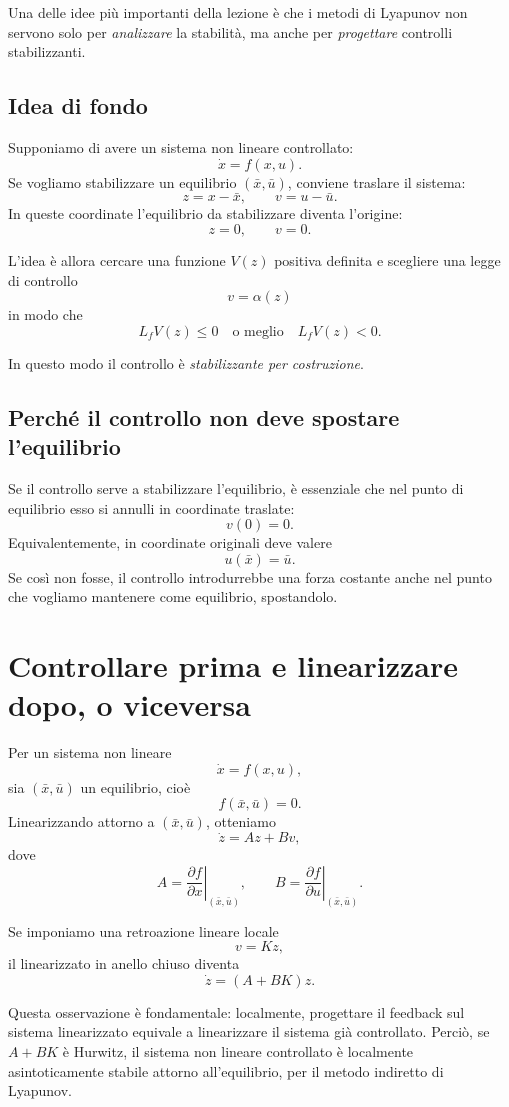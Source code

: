 Una delle idee più importanti della lezione è che i metodi di Lyapunov non servono solo per \emph{analizzare} la stabilità, ma anche per \emph{progettare} controlli stabilizzanti.

\subsection{Idea di fondo}

Supponiamo di avere un sistema non lineare controllato:
\[
\dot x = f(x,u).
\]
Se vogliamo stabilizzare un equilibrio \((\bar x,\bar u)\), conviene traslare il sistema:
\[
z=x-\bar x,
\qquad
v=u-\bar u.
\]
In queste coordinate l'equilibrio da stabilizzare diventa l'origine:
\[
z=0,\qquad v=0.
\]

L'idea è allora cercare una funzione \(V(z)\) positiva definita e scegliere una legge di controllo
\[
v=\alpha(z)
\]
in modo che
\[
L_fV(z)\le 0
\quad \text{o meglio} \quad
L_fV(z)<0.
\]

In questo modo il controllo è \emph{stabilizzante per costruzione}.

\subsection{Perché il controllo non deve spostare l'equilibrio}

Se il controllo serve a stabilizzare l'equilibrio, è essenziale che nel punto di equilibrio esso si annulli in coordinate traslate:
\[
v(0)=0.
\]
Equivalentemente, in coordinate originali deve valere
\[
u(\bar x)=\bar u.
\]
Se così non fosse, il controllo introdurrebbe una forza costante anche nel punto che vogliamo mantenere come equilibrio, spostandolo.

\section{Controllare prima e linearizzare dopo, o viceversa}

Per un sistema non lineare
\[
\dot x=f(x,u),
\]
sia \((\bar x,\bar u)\) un equilibrio, cioè
\[
f(\bar x,\bar u)=0.
\]
Linearizzando attorno a \((\bar x,\bar u)\), otteniamo
\[
\dot z = Az+Bv,
\]
dove
\[
A=\left.\frac{\partial f}{\partial x}\right|_{(\bar x,\bar u)},
\qquad
B=\left.\frac{\partial f}{\partial u}\right|_{(\bar x,\bar u)}.
\]

Se imponiamo una retroazione lineare locale
\[
v=Kz,
\]
il linearizzato in anello chiuso diventa
\[
\dot z = (A+BK)z.
\]

Questa osservazione è fondamentale: localmente, progettare il feedback sul sistema linearizzato equivale a linearizzare il sistema già controllato.  
Perciò, se \(A+BK\) è Hurwitz, il sistema non lineare controllato è localmente asintoticamente stabile attorno all'equilibrio, per il metodo indiretto di Lyapunov.


